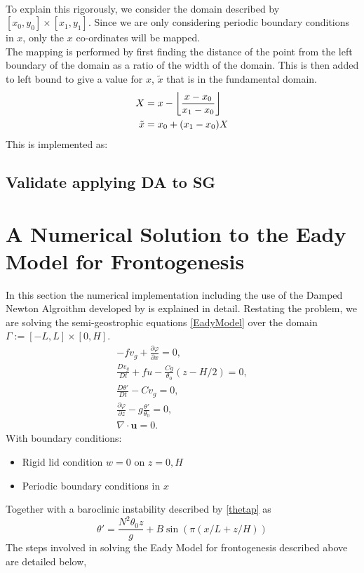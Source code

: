 \\
To explain this rigorously, we consider the domain described by $[x_0,y_0] \times [x_1,y_1]$. Since we are only considering periodic boundary conditions in $x$, only the $x$ co-ordinates will be mapped. 
\\
The mapping is performed by first finding the distance of the point from the left boundary of the domain as a ratio of the width of the domain. This is then added to left bound to give a value for $x$, $\tilde{x}$ that is in the fundamental domain. 
\begin{equation*}
	\begin{aligned}
		X &= x - \floor*{\frac{x - x_0}{x_1 - x_0}}\\
		\tilde{x} &= x_0 + (x_1 - x_0)X
	\end{aligned}
\end{equation*}
This is implemented as:
\section{Validate applying DA to SG}
\chapter{A Numerical Solution to the Eady Model for Frontogenesis \label{algorithm}}
In this section the numerical implementation including the use of the Damped Newton Algroithm developed by \cite{Merigot2017} is explained in detail. 
Restating the problem, we are solving the semi-geostrophic equations \ref{EadyModel} over the domain $\Gamma := [-L,L] \times [0,H]$.
\begin{equation*}
	\begin{aligned}
		-fv_g + \frac{\partial \varphi}{\partial x} = 0,\\
		\frac{Dv_g}{Dt} + fu -\frac{Cg}{\theta _0}\left(z-H/2\right) = 0,\\
		\frac{D\theta'}{Dt} - Cv_g = 0,\\
		\frac{\partial \varphi}{\partial z} - g\frac{\theta'}{\theta_0} = 0,\\
		\nabla \cdot \bm{u} = 0.
	\end{aligned}
\end{equation*}
With boundary conditions:
\vspace{-\topsep}
\begin{itemize}
	\setlength{\parskip}{0pt}
	\setlength{\itemsep}{0pt}
	\item Rigid lid condition $w = 0$ on $z = 0, H$
	\item Periodic boundary conditions in $x$
\end{itemize}
\vspace{-\topsep}
Together with a baroclinic instability described by \ref{thetap} as
\begin{equation}
\theta' = \frac{N^2\theta_0 z}{g} + B\sin\left(\pi\left(x/L + z/H\right)\right)
\end{equation}
The steps involved in solving the Eady Model for frontogenesis described above are detailed below,
